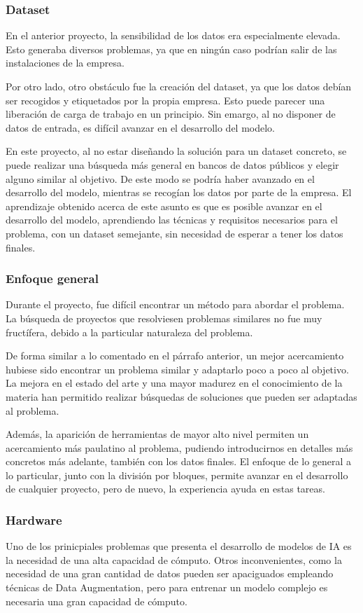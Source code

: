 \subsubsection{Dataset}
En el anterior proyecto, la sensibilidad de los datos era especialmente elevada.
Esto generaba diversos problemas, ya que en ningún caso podrían salir de las instalaciones de la empresa.

Por otro lado, otro obstáculo fue la creación del dataset, ya que los datos debían ser recogidos y etiquetados por la propia empresa.
Esto puede parecer una liberación de carga de trabajo en un principio. 
Sin emargo, al no disponer de datos de entrada, es difícil avanzar en el desarrollo del modelo.

En este proyecto, al no estar diseñando la solución para un dataset concreto, se puede realizar una búsqueda más general en bancos de datos públicos y elegir alguno similar al objetivo.
De este modo se podría haber avanzado en el desarrollo del modelo, mientras se recogían los datos por parte de la empresa.
El aprendizaje obtenido acerca de este asunto es que es posible avanzar en el desarrollo del modelo, aprendiendo las técnicas y requisitos necesarios para el problema, con un dataset semejante, sin necesidad de esperar a tener los datos finales.

\subsubsection{Enfoque general}
Durante el proyecto, fue difícil encontrar un método para abordar el problema.
La búsqueda de proyectos que resolviesen problemas similares no fue muy fructífera, debido a la particular naturaleza del problema.

De forma similar a lo comentado en el párrafo anterior, un mejor acercamiento hubiese sido encontrar un problema similar y adaptarlo poco a poco al objetivo.
La mejora en el estado del arte y una mayor madurez en el conocimiento de la materia han permitido realizar búsquedas de soluciones que pueden ser adaptadas al problema.

Además, la aparición de herramientas de mayor alto nivel permiten un acercamiento más paulatino al problema, pudiendo introducirnos en detalles más concretos más adelante, también con los datos finales.
El enfoque de lo general a lo particular, junto con la división por bloques, permite avanzar en el desarrollo de cualquier proyecto, pero de nuevo, la experiencia ayuda en estas tareas.

\subsubsection{Hardware}
Uno de los prinicpiales problemas que presenta el desarrollo de modelos de IA es la necesidad de una alta capacidad de cómputo.
Otros inconvenientes, como la necesidad de una gran cantidad de datos pueden ser apaciguados empleando técnicas de Data Augmentation, pero para entrenar un modelo complejo es necesaria una gran capacidad de cómputo.

